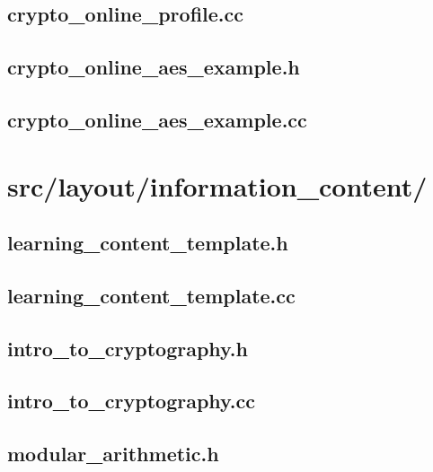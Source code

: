 \subsection{crypto_online_profile.cc}

\newpage

\subsection{crypto_online_aes_example.h}

\newpage

\subsection{crypto_online_aes_example.cc}

\newpage

\section{src/layout/information_content/}

\subsection{learning_content_template.h}

\newpage

\subsection{learning_content_template.cc}

\newpage

\subsection{intro_to_cryptography.h}

\newpage

\subsection{intro_to_cryptography.cc}

\newpage

\subsection{modular_arithmetic.h}

\newpage

